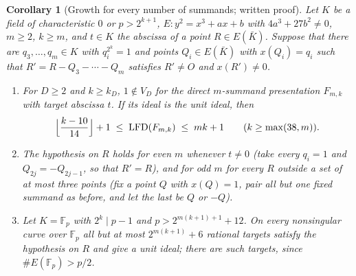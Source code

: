 \documentclass[11pt]{article}
\newtheorem{corollary}[theorem]{Corollary}
\theoremstyle{definition}\newtheorem{definition}[theorem]{Definition}
\theoremstyle{remark}\newtheorem{remark}[theorem]{Remark}
\newcommand{\F}{\mathbb F}
\newcommand{\lfd}{\operatorname{LFD}}
\begin{document}
\begin{corollary}[Growth for every number of summands; written proof]\label{cor:growthm}
Let $K$ be a field of characteristic $0$ or $p>2^{k+1}$, $E\colon
y^2=x^3+ax+b$ with $4a^3+27b^2\ne0$, $m\ge2$, $k\ge m$, and
$t\in K$ the abscissa of a point $R\in E(\bar K)$. Suppose that there are
$q_3,\ldots,q_m\in K$ with $q_i^{2^k}=1$ and points $Q_i\in E(\bar K)$
with $x(Q_i)=q_i$ such that $R'=R-Q_3-\cdots-Q_m$ satisfies $R'\ne O$ and
$x(R')\ne0$.
\begin{enumerate}
\item For $D\ge2$ and $k\ge k_D$, $1\notin V_D$ for the direct $m$-summand
 presentation $F_{m,k}$ with target abscissa $t$. If its ideal is the unit
 ideal, then
 \[
 \Bigl\lfloor\frac{k-10}{14}\Bigr\rfloor+1\;\le\;\lfd(F_{m,k})\;\le\;mk+1
 \qquad(k\ge\max(38,m)).
 \]
\item The hypothesis on $R$ holds for even $m$ whenever $t\ne0$ (take every
 $q_i=1$ and $Q_{2j}=-Q_{2j-1}$, so that $R'=R$), and for odd $m$ for every
 $R$ outside a set of at most three points (fix a point $Q$ with $x(Q)=1$,
 pair all but one fixed summand as before, and let the last be $Q$ or $-Q$).
\item Let $K=\F_p$ with $2^k\mid p-1$ and $p>2^{m(k+1)+1}+12$. On every
 nonsingular curve over $\F_p$ all but at most $2^{m(k+1)}+6$ rational
 targets satisfy the hypothesis on $R$ and give a unit ideal; there are
 such targets, since $\#E(\F_p)>p/2$.
\end{enumerate}
\end{corollary}
\end{document}

